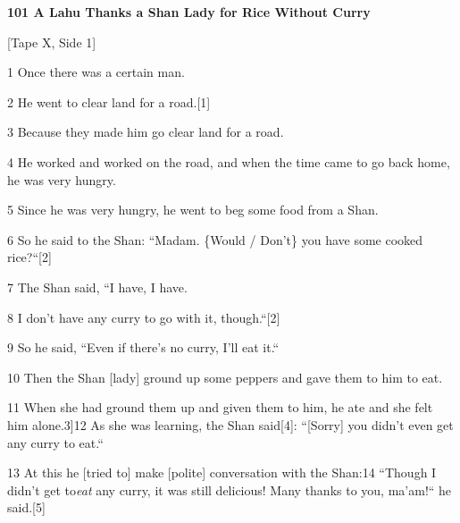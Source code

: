 
\textbf{101 A Lahu Thanks a Shan Lady for Rice Without Curry }

[Tape X, Side 1]

1 Once there was a certain man.

2 He went to clear land for a road.[1]

3 Because they made him go clear land for a road.

4 He worked and worked on the road, and when the time came to go back home, he
was very hungry.

5 Since he was very hungry, he went to beg some food from a Shan.

6 So he said to the Shan: ``Madam. \{Would / Don't\} you have some cooked
rice?``[2]

7 The Shan said, ``I have, I have.

8 I don't have any curry to go with it, though.``[2]

9 So he said, ``Even if there's no curry, I'll eat it.``

10 Then the Shan [lady] ground up some peppers and gave them to him to eat.

11 When she had ground them up and given them to him, he ate and she felt him alone.3]12
As she was learning, the Shan said[4]: ``[Sorry] you didn't even get any
curry to eat.``

13 At this he [tried to] make [polite] conversation with the Shan:14 ``Though
I didn't get to\textit{eat} any curry, it was still delicious! Many thanks to you,
ma'am!`` he said.[5]

